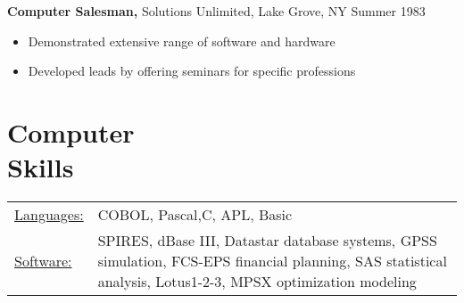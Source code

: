 \documentclass[margin]{res}
\begin{document}
\begin{resume}
    {\bf Computer Salesman,} Solutions Unlimited, Lake Grove, NY \hfill
    Summer 1983                
                    \begin{itemize} \itemsep -2pt
                     \item  Demonstrated extensive range of software and 
                     hardware 
                    
                     \item Developed leads by offering seminars for specific 
                     professions 
    
             \end{itemize}
    
    \section{Computer \\ Skills}
       \begin{tabular}{l p{3in}}
        \underline{Languages:} & COBOL, Pascal,C, APL, Basic \\
    
         \underline{Software:} &  SPIRES, dBase III, Datastar database 
                            systems, GPSS simulation, FCS-EPS financial 
                            planning, SAS statistical analysis, 
                            Lotus1-2-3, MPSX optimization modeling 
     \end{tabular}
    
    \end{resume} 
    
\end{document}
